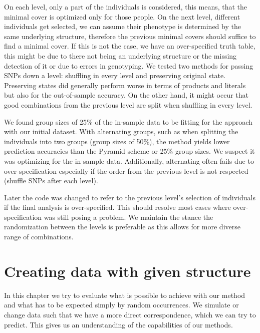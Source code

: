 \documentclass[letterpaper, 11pt]{article}
\begin{document}
On each level, only a part of the individuals is considered, this means, that the minimal cover is optimized only for those people. On the next level, different individuals get selected, we can assume their phenotype is determined by the same underlying structure, therefore the previous minimal covers should suffice to find a minimal cover. If this is not the case, we have an over-specified truth table, this might be due to there not being an underlying structure or the missing detection of it or due to errors in genotyping. 
We tested two methods for passing SNPs down a level: shuffling in every level and preserving original state. Preserving states did generally perform worse in terms of products and literals but also for the out-of-sample accuracy. On the other hand, it might occur that good combinations from the previous level are split when shuffling in every level.

We found group sizes of 25\% of the in-sample data to be fitting for the approach with our initial dataset. With alternating groups, such as when splitting the individuals into two groups (group sizes of 50\%), the method yields lower prediction accuracies than the Pyramid scheme or 25\% group sizes. We suspect it  was optimizing for the in-sample data. Additionally, alternating often fails due to over-specification especially if the order from the previous level is not respected (shuffle SNPs after each level).

Later the code was changed to refer to the previous level's selection of individuals if the final analysis is over-specified. This should resolve most cases where over-specification was still posing a problem.  We maintain the stance the randomization between the levels is preferable as this allows for more diverse range of combinations.

\section{Creating data with given structure}
In this chapter we try to evaluate what is possible to achieve with our method and what has to be expected simply by random occurrences. We simulate or change data such that we have a more direct correspondence, which we can try to predict. This gives us an understanding of the capabilities of our methods.
\end{document}
